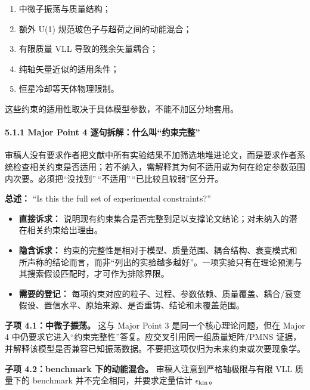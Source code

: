 \documentclass[
  chinese,
  UTF8]{ctexart}
\providecommand{\tightlist}{%
  \setlength{\itemsep}{0pt}\setlength{\parskip}{0pt}}
\begin{document}
\begin{enumerate}
\def\labelenumi{\arabic{enumi}.}
\tightlist
\item
  中微子振荡与质量结构；
\item
  额外 U(1) 规范玻色子与超荷之间的动能混合；
\item
  有限质量 VLL 导致的残余矢量耦合；
\item
  纯轴矢量近似的适用条件；
\item
  恒星冷却等天体物理限制。
\end{enumerate}

这些约束的适用性取决于具体模型参数，不能不加区分地套用。

\paragraph{5.1.1 Major Point 4
逐句拆解：什么叫``约束完整''}\label{major-point-4-ux9010ux53e5ux62c6ux89e3ux4ec0ux4e48ux53ebux7ea6ux675fux5b8cux6574}

审稿人没有要求作者把文献中所有实验结果不加筛选地堆进论文，而是要求作者系统检查相关约束是否适用；若不纳入，需解释其为何不适用或为何在给定参数范围内次要。必须把``没找到''\,``不适用''\,``已比较且较弱''区分开。

\textbf{总述：} ``Is this the full set of experimental constraints?''

\begin{itemize}
\tightlist
\item
  \textbf{直接诉求：}
  说明现有约束集合是否完整到足以支撑论文结论；对未纳入的潜在相关约束给出理由。
\item
  \textbf{隐含诉求：}
  约束的完整性是相对于模型、质量范围、耦合结构、衰变模式和所声称的结论而言，而非``列出的实验越多越好''。一项实验只有在理论预测与其搜索假设匹配时，才可作为排除界限。
\item
  \textbf{需要的登记：}
  每项约束对应的粒子、过程、参数依赖、质量覆盖、耦合/衰变假设、置信水平、原始来源、是否重铸、结论和未覆盖范围。
\end{itemize}

\textbf{子项 4.1：中微子振荡。} 这与 Major Point 3
是同一个核心理论问题，但在 Major 4
中仍要求它进入``约束完整性''答复。应交叉引用同一组质量矩阵/PMNS
证据，并解释该模型是否兼容已知振荡数据。不要把这项仅归为未来约束或次要现象学。

\textbf{子项 4.2：benchmark 下的动能混合。} 审稿人注意到严格轴极限与有限
VLL 质量下的 benchmark 并不完全相同，并要求定量估计
\(\epsilon_{\rm kin}\)。
\end{document}

